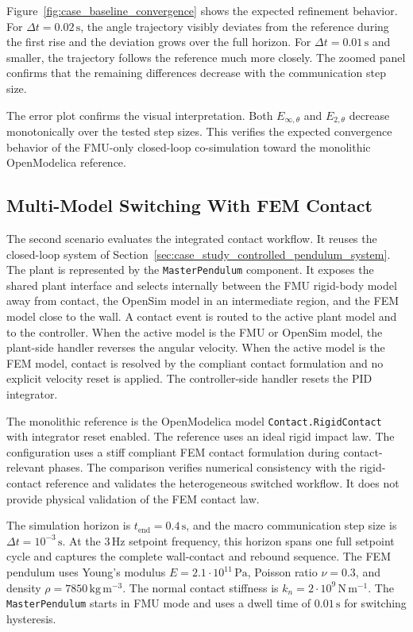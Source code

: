 Figure~\ref{fig:case_baseline_convergence} shows the expected refinement behavior.
For \(\Delta t=0.02\,\mathrm{s}\), the angle trajectory visibly deviates from the reference during the first rise and the deviation grows over the full horizon.
For \(\Delta t=0.01\,\mathrm{s}\) and smaller, the trajectory follows the reference much more closely.
The zoomed panel confirms that the remaining differences decrease with the communication step size.

The error plot confirms the visual interpretation.
Both \(E_{\infty,\theta}\) and \(E_{2,\theta}\) decrease monotonically over the tested step sizes.
This verifies the expected convergence behavior of the \ac{FMU}-only closed-loop co-simulation toward the monolithic OpenModelica reference.

\subsection{Multi-Model Switching With FEM Contact}
\label{sec:case_study_multimodel_contact}

The second scenario evaluates the integrated contact workflow.
It reuses the closed-loop system of Section~\ref{sec:case_study_controlled_pendulum_system}.
The plant is represented by the \texttt{MasterPendulum} component.
It exposes the shared plant interface and selects internally between the \ac{FMU} rigid-body model away from contact, the OpenSim model in an intermediate region, and the \ac{FEM} model close to the wall.
A contact event is routed to the active plant model and to the controller.
When the active model is the \ac{FMU} or OpenSim model, the plant-side handler reverses the angular velocity.
When the active model is the \ac{FEM} model, contact is resolved by the compliant contact formulation and no explicit velocity reset is applied.
The controller-side handler resets the \ac{PID} integrator.

The monolithic reference is the OpenModelica model \texttt{Contact.RigidContact} with integrator reset enabled.
The reference uses an ideal rigid impact law.
The \syssimx{} configuration uses a stiff compliant \ac{FEM} contact formulation during contact-relevant phases.
The comparison verifies numerical consistency with the rigid-contact reference and validates the heterogeneous switched workflow.
It does not provide physical validation of the \ac{FEM} contact law.

The simulation horizon is \(t_{\mathrm{end}}=0.4\,\mathrm{s}\), and the macro communication step size is \(\Delta t=10^{-3}\,\mathrm{s}\).
At the \(3\,\mathrm{Hz}\) setpoint frequency, this horizon spans one full setpoint cycle and captures the complete wall-contact and rebound sequence.
The \ac{FEM} pendulum uses Young's modulus \(E=2.1\cdot 10^{11}\,\mathrm{Pa}\), Poisson ratio \(\nu=0.3\), and density \(\rho=7850\,\mathrm{kg\,m^{-3}}\).
The normal contact stiffness is \(k_n=2\cdot 10^9\,\mathrm{N\,m^{-1}}\).
The \texttt{MasterPendulum} starts in \ac{FMU} mode and uses a dwell time of \(0.01\,\mathrm{s}\) for switching hysteresis.

